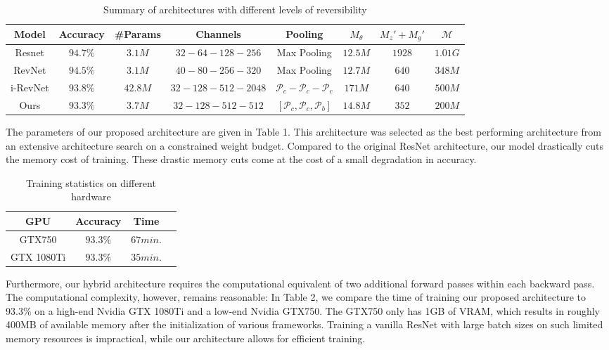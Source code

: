 \documentclass[twocolumn]{bmcart}
\begin{document}
\begin{table*}[t]
\begin{tabular}{ c c c c c c c c}	
Model     & Accuracy & \#Params & Channels & Pooling  & $M_{\theta}$ & $M_{z}'+M_{g}'$ & $\mathcal{M} $ \\
\hline
Resnet    & $94.7\%$   & $3.1M$   &  $32 - 64 - 128  - 256$       & Max Pooling      				           &  $12.5M$   &  $1928$  & $1.01G$  \\			
RevNet    & $94.5\%$   & $3.1M$   &  $40 - 80 - 256  - 320$       & Max Pooling      				           &  $12.7M$   &  $640$   & $348M$   \\
i-RevNet  & $93.8\%$   & $42.8M$  &  $32 - 128 - 512 - 2048$      & $\mathcal{P}_c - \mathcal{P}_c - \mathcal{P}_c$          &  $171M$    &  $640$   & $500M$   \\
Ours      & $93.3\%$   & $3.7M$   &  $32 - 128 - 512 - 512$       & $[\mathcal{P}_c, \mathcal{P}_c, \mathcal{P}_b]$          &  $14.8M$   &  $352$   & $200M$   \\
\hline
\end{tabular}
\begin{center}
\caption{Summary of architectures with different levels of reversibility}
\end{center}
\end{table*}

The parameters of our proposed architecture are given in Table 1.
This architecture was selected as the best performing architecture 
from an extensive architecture search on a constrained weight budget. 
Compared to the original ResNet architecture, our model drastically cuts the memory cost of training.
These drastic memory cuts come at the cost of a small degradation in accuracy.

\begin{table}[h]
\centering
\begin{tabular}{ c c c c}	
 GPU & Accuracy  & Time \\
\hline			
GTX750     & $93.3\%$  & $67 min.$    \\
GTX 1080Ti & $93.3\%$  & $35 min.$  \\
\hline
\end{tabular}
\caption{Training statistics on different hardware}
\end{table}

Furthermore, our hybrid architecture requires the computational equivalent of two additional forward passes within each backward pass.
The computational complexity, however, remains reasonable:
In Table 2, we compare the time of training our proposed architecture to 93.3\% on a high-end Nvidia GTX 1080Ti and a low-end
Nvidia GTX750.
The GTX750 only has 1GB of VRAM, which results in roughly 400MB of available memory after the initialization of various frameworks.
Training a vanilla ResNet with large batch sizes on such limited memory resources is impractical, while our architecture allows for efficient training. 
\end{document}
